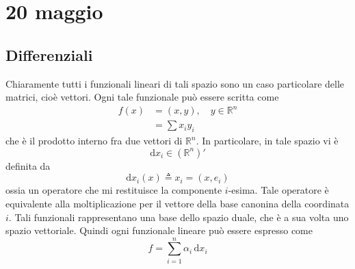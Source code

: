 \documentclass[a4paper]{article}
\begin{document}
\pagebreak

\section{20 maggio}




\pagebreak

\subsection{Differenziali}


Chiaramente tutti i funzionali lineari di tali spazio sono un caso particolare
delle matrici, cioè vettori. Ogni tale funzionale può essere scritta come
\begin{align*}
    f(x) &= (x,y), \quad y\in \mathbb{R}^n \\
    &= \sum x_i y_i
\end{align*}
che è il prodotto interno fra due vettori di \(\mathbb{R}^n\).
In particolare, in tale spazio vi è
\[
    \text{d}x_i \in \left(\mathbb{R}^n\right)'
\]
definita da
\[
    \text{d}x_i(x) \triangleq x_i = (x, e_i)
\]
ossia un operatore che mi restituisce la componente \(i\)-esima.
Tale operatore è equivalente alla moltiplicazione per il vettore della base
canonina della coordinata \(i\).
Tali funzionali rappresentano una base dello spazio duale, che è a sua volta uno spazio vettoriale.
Quindi ogni funzionale lineare può essere espresso come
\[
    f = \sum_{i=1}^n \alpha_i \,\text{d}x_i
\]
\end{document}
